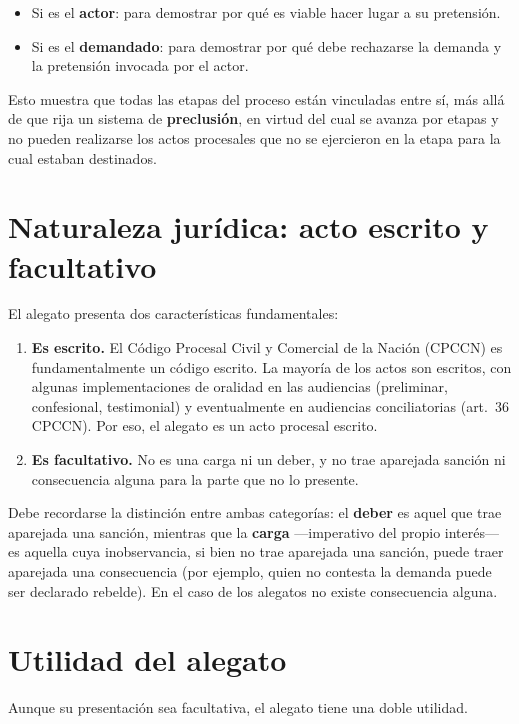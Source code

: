 \documentclass[12pt,oneside]{book}
\begin{document}
\begin{itemize}
    \item Si es el \textbf{actor}: para demostrar por qué es viable hacer lugar a su pretensión.
    \item Si es el \textbf{demandado}: para demostrar por qué debe rechazarse la demanda y la pretensión invocada por el actor.
\end{itemize}

Esto muestra que todas las etapas del proceso están vinculadas entre sí, más allá de que rija un sistema de \textbf{preclusión}, en virtud del cual se avanza por etapas y no pueden realizarse los actos procesales que no se ejercieron en la etapa para la cual estaban destinados.

\section{Naturaleza jurídica: acto escrito y facultativo}

El alegato presenta dos características fundamentales:

\begin{enumerate}[label=\Alph*)]
    \item \textbf{Es escrito.} El Código Procesal Civil y Comercial de la Nación (CPCCN) es fundamentalmente un código escrito. La mayoría de los actos son escritos, con algunas implementaciones de oralidad en las audiencias (preliminar, confesional, testimonial) y eventualmente en audiencias conciliatorias (art.~36 CPCCN). Por eso, el alegato es un acto procesal escrito.
    \item \textbf{Es facultativo.} No es una carga ni un deber, y no trae aparejada sanción ni consecuencia alguna para la parte que no lo presente.
\end{enumerate}

Debe recordarse la distinción entre ambas categorías: el \textbf{deber} es aquel que trae aparejada una sanción, mientras que la \textbf{carga} ---imperativo del propio interés--- es aquella cuya inobservancia, si bien no trae aparejada una sanción, puede traer aparejada una consecuencia (por ejemplo, quien no contesta la demanda puede ser declarado rebelde). En el caso de los alegatos no existe consecuencia alguna.

\section{Utilidad del alegato}

Aunque su presentación sea facultativa, el alegato tiene una doble utilidad.
\end{document}
